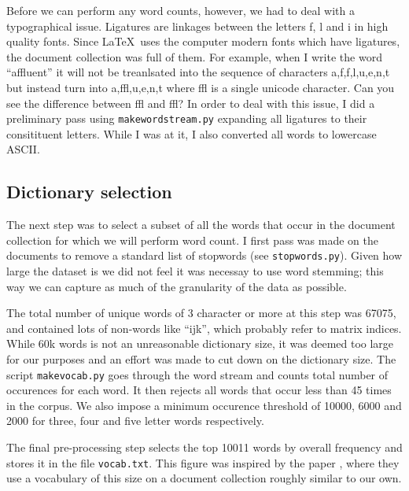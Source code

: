 \documentclass[11pt]{article}
\newcommand{\file}[1]{\texttt{#1}}
\newcommand{\program}[1]{\texttt{#1}}
\begin{document}
        Before we can perform any word counts, however, we had to deal with a typographical issue.
        Ligatures are linkages between the letters f, l and i in high quality fonts.
        Since \LaTeX \ uses the computer modern fonts which have ligatures, the document collection
        was full of them. For example, when I write the word ``affluent'' it will not be treanlsated
        into the sequence of characters a,f,f,l,u,e,n,t but instead turn into a,ffl,u,e,n,t where 
        ffl is a single unicode character. Can you see the difference between ffl and f{}f{}l?
        In order to deal with this issue, I did a preliminary pass using \program{makewordstream.py}
        expanding all ligatures to their consitituent letters. 
        While I was at it, I also converted all words to lowercase ASCII.
		  

    \subsection{Dictionary selection}

        The next step was to select a subset of all the words that occur in the document collection
        for which we will perform word count.
		I first pass was made on the documents to remove a standard list of stopwords (see
        \file{stopwords.py}). 
		Given how large the dataset is we did not feel it was necessay to use word stemming;
        this way we can capture as much of the granularity of the data as possible.

        The total number of unique words of 3 character or more at this step was 67075, and
        contained lots of non-words like ``ijk'', which probably refer to matrix indices.
        While 60k words is not an unreasonable dictionary size, it was deemed too large for
        our purposes and an effort was made to cut down on the dictionary size.
        The script \program{makevocab.py} goes through the word stream and counts total
        number of occurences for each word. It then rejects all words that occur less than
        45 times in the corpus. 
        We also impose a minimum occurence threshold of 10000, 6000 and 2000 for three, four and
        five letter words respectively.

        The final pre-processing step selects the top 10011 words by overall frequency 
        and stores it in the file \file{vocab.txt}.
        This figure was inspired by the paper \cite{Blei2009}, where they use a vocabulary of this
        size on a document collection roughly similar to our own.
\end{document}
